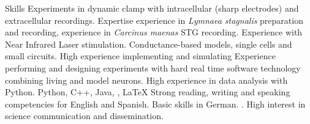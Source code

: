 \begin{rubric}{Skills}
	Experiments in dynamic clamp with intracellular (sharp electrodes) and extracellular recordings. Expertise experience in \textit{Lymnaea stagnalis} preparation and recording, experience in \textit{Carcinus maenas} STG recording.
    Experience with Near Infrared Laser stimulation.
    \large{Conductance-based models}, single cells and small circuits. High experience implementing and simulating 
 Experience performing and designing experiments with hard real time software technology combining living and model neurons. 
    High experience in data analysis with \large{Python}. 
	Python, C++, Java, , \LaTeX
{}
	Strong reading, writing and speaking competencies for English and Spanish. Basic skills in German.
. High interest in science communication and dissemination.

\end{rubric}
